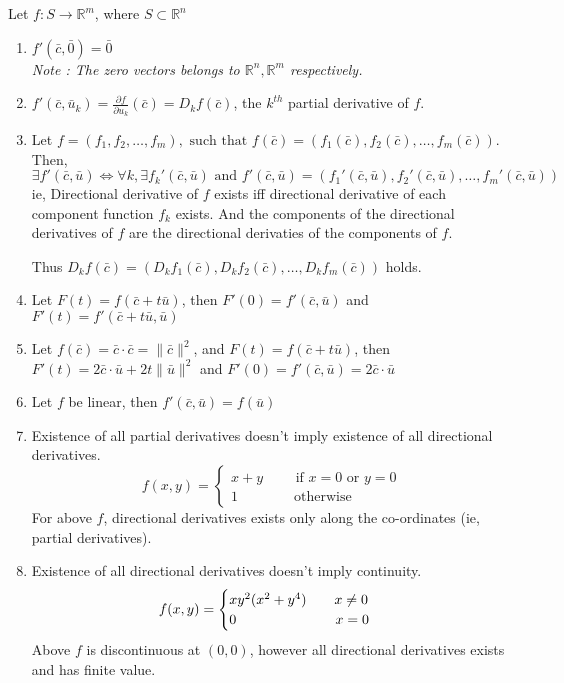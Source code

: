 \begin{remark}[Properties] Let \(f : S \to \mathbb{R}^m \), where \( S \subset \mathbb{R}^n\)
\begin{enumerate}
	\item \( f'(\bar{c},\bar{0}) = \bar{0} \)\\
	\textsl{Note : The zero vectors belongs to $\mathbb{R}^n, \mathbb{R}^m$ respectively.}
	\item \( f'(\bar{c},\bar{u}_k) = \frac{\partial f}{\partial u_k}(\bar{c}) = D_k f(\bar{c}) \), the $k^{th}$ partial derivative of $f$.
	\item Let \( f = (f_1, f_2, \dots, f_m), \text{ such that } f(\bar{c}) = \left(f_1(\bar{c}),f_2(\bar{c}),\dots,f_m(\bar{c})\right) \).
	Then, 
		\[ \exists f'(\bar{c},\bar{u}) \iff \forall k, \exists f_k'(\bar{c},\bar{u}) \text{ and } f'(\bar{c},\bar{u}) = \left(f_1'(\bar{c},\bar{u}),f_2'(\bar{c},\bar{u}),\dots,f_m'(\bar{c},\bar{u})\right) \]
	ie, Directional derivative of $f$ exists iff directional derivative of each component function $f_k$ exists.
	And the components of the directional derivatives of $f$ are the directional derivaties of the components of $f$.

	Thus \( D_k f(\bar{c}) = \left(D_k f_1(\bar{c}),D_k f_2(\bar{c}),\dots,D_k f_m(\bar{c}) \right) \) holds.
	\item Let \( F(t) = f(\bar{c}+t\bar{u}) \), then \( F'(0) = f'(\bar{c},\bar{u}) \) and \( F'(t) = f'(\bar{c}+t\bar{u},\bar{u}) \)
	\item Let \( f(\bar{c}) = \bar{c} \cdot \bar{c} = \|\bar{c}\|^2 \), and \(F(t) = f(\bar{c}+t\bar{u}) \), then \( F'(t) = 2\bar{c} \cdot \bar{u}+2t\|\bar{u}\|^2 \) and \( F'(0) = f'(\bar{c},\bar{u}) = 2\bar{c} \cdot \bar{u} \)
	\item Let \(f\) be linear, then \( f'(\bar{c},\bar{u}) = f(\bar{u}) \)
	\item Existence of all partial derivatives doesn't imply existence of all directional derivatives.
	\[ f(x,y) = \begin{cases} x+y \qquad \text{ if } x = 0 \text{ or } y = 0 \\ 1 \qquad \qquad \text{otherwise} \end{cases} \]
	For above \(f\), directional derivatives exists only along the co\nobreakdash-ordinates (ie, partial derivatives).
	\item Existence of all directional derivatives doesn't imply continuity.
	\[ f(x,y) = \begin{cases} xy^2(x^2+y^4) \qquad x \ne 0 \\ 0 \hspace{2.5cm} x = 0 \end{cases} \]
	Above \(f\) is discontinuous at \((0,0)\), however all directional derivatives exists and has finite value.
	\end{enumerate}
\end{remark}

